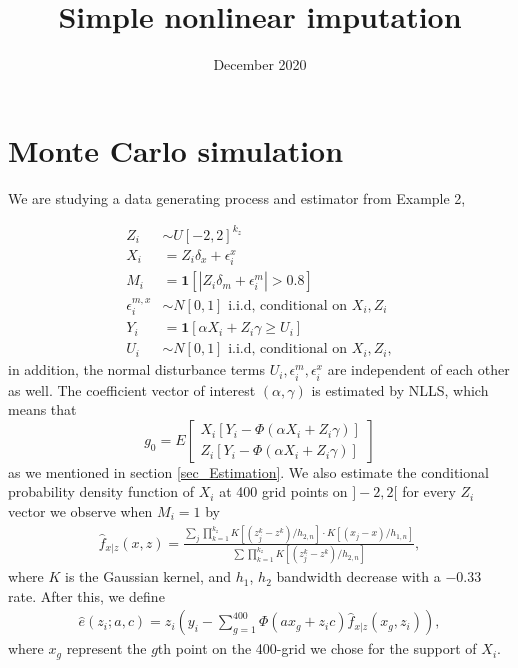 \documentclass{article}
\title{Simple nonlinear imputation}
\author{}
\date{December 2020}
\theoremstyle{definition}
\theoremstyle{remark}
\begin{document}
\maketitle

\onehalfspacing


\section{Monte Carlo simulation}

We are studying a data generating process and estimator from Example 2,

\begin{align}
Z_i &\sim U[-2, 2]^{k_z}\\
X_i &= Z_i\delta_x + \epsilon^x_i \\
M_i &= \mathbf{1}[|Z_i \delta_m + \epsilon^m_{i}|>0.8] \\
\epsilon^{m,x}_{i} &\sim N[0,1] \text{  i.i.d, conditional on $X_i, Z_i$} \\
Y_i &= \mathbf{1}[\alpha X_i + Z_i \gamma \geq U_{i}] \\
U_{i} &\sim N[0,1] \text{  i.i.d, conditional on $X_i, Z_i$},
\end{align}
in addition, the normal disturbance terms $U_i, \epsilon_i^m, \epsilon_i^x$ are independent of each other as well. The coefficient vector of interest $(\alpha, \gamma)$ is estimated by NLLS, which means that
\[g_0 = E\left[\begin{array}{c}X_i[Y_i - \Phi(\alpha X_i + Z_i \gamma)] \\
							   Z_i[Y_i - \Phi(\alpha X_i + Z_i \gamma)]
				\end{array}\right]
\] 
as we mentioned in section \ref{sec_Estimation}. We also estimate the conditional probability density function of $X_i$ at 400 grid points on $]-2,2[$ for every $Z_i$ vector we observe when $M_i=1$ by
\begin{align}
\hat{f}_{x|z}(x,z) = \frac{\sum_j \prod_{k=1}^{k_z} K[(z^k_j-z^k)/h_{2,n}] \cdot K[(x_j - x)/h_{1,n}]}{\sum \prod_{k=1}^{k_z} K[(z^k_j-z^k)/h_{2,n}]},
\end{align}
where $K$ is the Gaussian kernel, and $h_1$, $h_2$ bandwidth decrease with a $-0.33$ rate. After this, we define
\begin{align}
\hat{e}(z_i; a, c) = z_i \left(y_i-\sum_{g=1}^{400}\Phi\left(a x_g + z_i c\right)\hat{f}_{x|z}(x_g,z_i)\right), 
\end{align}
where $x_g$ represent the $g$th point on the 400-grid we chose for the support of $X_i$.
\end{document}
